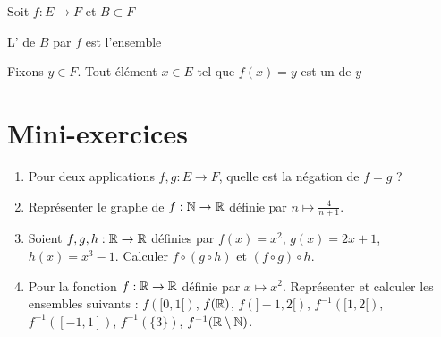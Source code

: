 

\begin{frame}
Soit $f : E \to F$ et $B \subset F$
\begin{mydefinition}
L' de $B$ par $f$ est l'ensemble

\vspace*{-3mm}
\end{mydefinition}
\pause
\hspace*{-10mm}
\vspace*{-6mm}

\end{frame}


\begin{frame}
Fixons $y \in F$. Tout élément $x\in E$ tel que $f(x)=y$ est un 
de $y$

\end{frame}





\section{Mini-exercices}


\begin{frame}
\begin{miniexercice}
\begin{enumerate}

  \item Pour deux applications $f,g : E \to F$, quelle est la négation de $f=g$ ?

  \item Représenter le graphe de $f : \mathbb{N} \to \mathbb{R}$ définie par $n \mapsto \frac{4}{n+1}$.

  \item Soient $f,g,h : \mathbb{R} \to \mathbb{R}$ définies par $f(x)=x^2$, $g(x)=2x+1$, $h(x)=x^3-1$. Calculer $f\circ (g \circ h)$ et
$(f \circ g ) \circ h$.

  \item Pour la fonction $f : \mathbb{R} \to \mathbb{R}$ définie par $x \mapsto x^2$. Représenter et calculer les ensembles suivants :
$f([0,1[)$, $f(\mathbb{R})$, $f(]-1,2[)$,  $f^{-1}([1,2[)$, $f^{-1}([-1,1])$, $f^{-1}(\{3\})$, $f^{-1}(\mathbb{R} \setminus \mathbb{N})$.

\end{enumerate}
\end{miniexercice}
\end{frame}




